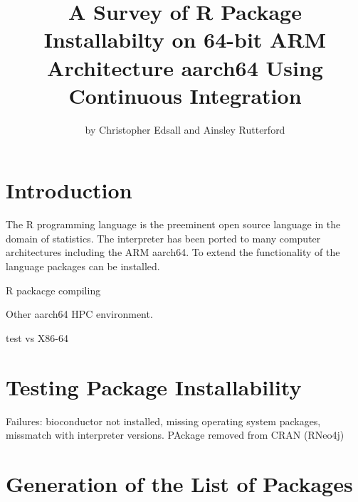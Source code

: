 \title{A Survey of R Package Installabilty on 64-bit ARM Architecture aarch64 Using Continuous Integration}
\author{by Christopher Edsall and Ainsley Rutterford}

\maketitle


\section{Introduction}

The R programming language\citep{R:Ihaka+Gentleman:1996} is the preeminent
open source language in the domain of
statistics\citep{muenchen2012popularity}. The interpreter has been ported to
many computer architectures including the \textsc{ARM} aarch64. To extend
the functionality of the language packages can be installed.

R packacge compiling

Other aarch64 HPC environment.

test vs X86-64

\section{Testing Package Installability}


Failures: bioconductor not installed, missing operating system packages, missmatch with interpreter versions. PAckage removed from CRAN (RNeo4j)

\section{Generation of the List of Packages}

